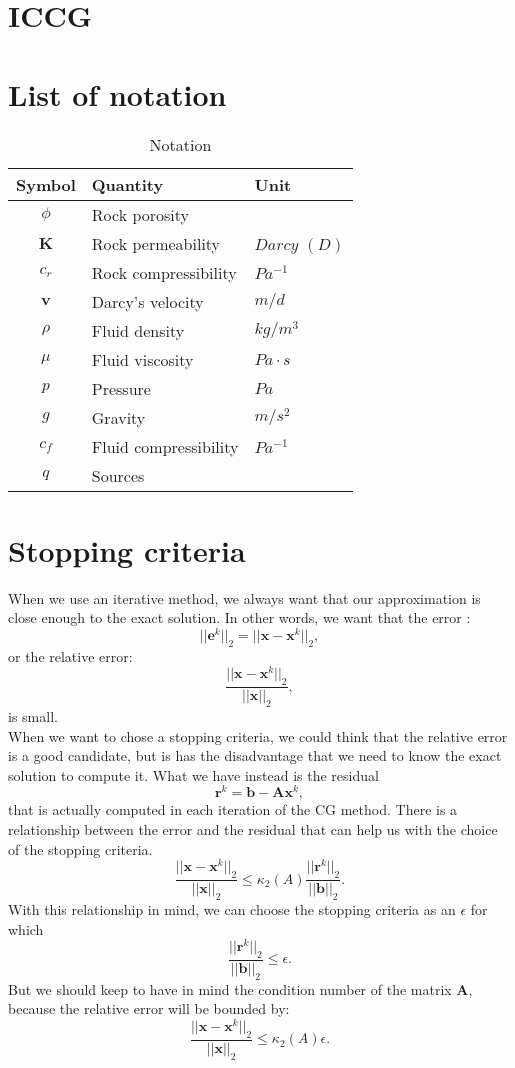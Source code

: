 \documentclass[12pt]{article}
\begin{document}
\newpage

 
 \newpage
 
% 
\newpage
\newpage
\appendix
\section{ICCG }\label{a}



\section{List of notation}\label{a1}


\begin{table}[!h]
\centering
\begin{tabular}{c l l }
\hline
Symbol & Quantity & Unit \\[0.5ex]
\hline
$\phi$ & Rock porosity&   \\
 $\mathbf{K}$& Rock permeability&  $Darcy$ $(D)$ \\
 $c_r$& Rock compressibility&  $Pa^{-1}$ \\
$\mathbf{v}$ & Darcy's velocity& $ m/d$ \\
$\rho$ &Fluid density &  $kg/m^3$ \\
 $\mu$&Fluid viscosity & $Pa \cdot s$   \\
${p}$  &Pressure &  $Pa$ \\
$g$  &Gravity &  $m/s^2$ \\
$c_f$ &Fluid compressibility &  $Pa^{-1}$ \\
$q$ &Sources &   \\
\hline
\end{tabular}\label{table:symbols}
\caption{Notation}
\end{table}

\newpage
\section{Stopping criteria}\label{a2}
When we use an iterative method, we always want that our approximation is close enough 
to the exact solution. In other words, we want that the error \cite[pag. 42]{Saad03}: 
$$||\mathbf{e}^k||_2=||\mathbf{x}-\mathbf{x}^k||_2,$$ or the relative error: 
$$\frac{||\mathbf{x}-\mathbf{x}^k||_2}{||\mathbf{x}||_2},$$is small. \\
When we want to chose a stopping criteria, we could think that the relative error is a
good candidate, but is has the disadvantage that we need to know the exact solution to compute it.
What we have instead is the residual $$\mathbf{r}^k=\mathbf{b}-\mathbf{A}\mathbf{x}^k,$$ 
that is actually computed in each iteration of the CG method. There is a relationship between the 
error and the residual that can help us with the choice of the stopping criteria.
$$\frac{||\mathbf{x}-\mathbf{x}^k||_2}{||\mathbf{x}||_2}\leq \kappa_2(A)\frac{||\mathbf{r}^k||_2}{||\mathbf{b}||_2}.$$
With this relationship in mind, we can choose the stopping criteria as an $\epsilon$ for which
$$ \frac{||\mathbf{r}^k||_2}{||\mathbf{b}||_2}\leq \epsilon.$$
But we should keep to have in mind the condition number of the matrix $\mathbf{A}$, because the relative error will be bounded by:
$$\frac{||\mathbf{x}-\mathbf{x}^k||_2}{||\mathbf{x}||_2}\leq \kappa_2(A) \epsilon.$$
\newpage
\end{document}
